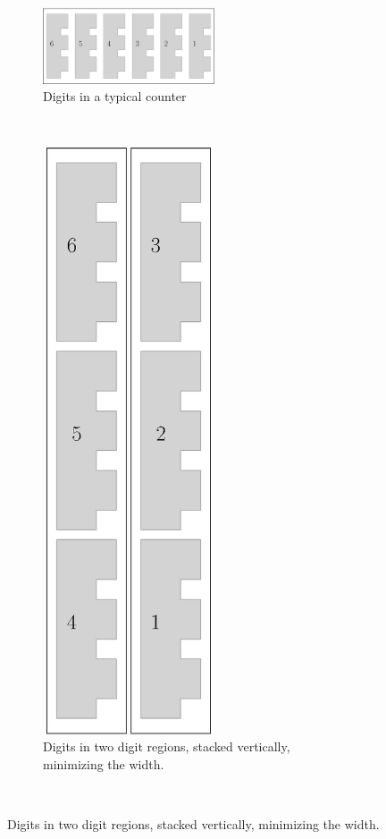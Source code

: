 \begin{figure}[H]
    \centering
    \begin{subfigure}[t]{0.49\textwidth}
        \centering
        \includegraphics[width=2in]{digits_normal_counter}
        \caption{\label{fig:digits_normal_counter} Digits in a typical counter}
    \end{subfigure}%
    ~
    \begin{subfigure}[t]{0.49\textwidth}
        \centering
        \includegraphics[width=2in]{digits_digit_region_counter}
        \caption{\label{fig:digits_digit_region_counter} Digits in two digit regions, stacked vertically, minimizing the width. }
    \end{subfigure}%
    ~
\end{figure}

